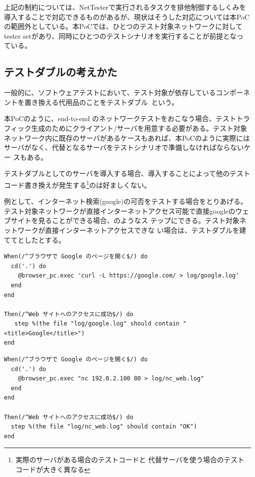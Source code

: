 上記の制約については、NetTesterで実行されるタスクを排他制御するしくみを
導入することで対応できるものがあるが、現状はそうした対応については本PoC
の範囲外としている。本PoCでは、ひとつのテスト対象ネットワークに対して
tester setがあり、同時にひとつのテストシナリオを実行することが前提となっ
ている。

  \subsection{テストダブルの考えかた}
一般的に、ソフトウェアテストにおいて、テスト対象が依存しているコンポーネ
ントを置き換える代用品のことをテストダブル~\cite{test-double}という。

本PoCのように、end-to-end のネットワークテストをおこなう場合、テストトラ
フィック生成のためにクライアント/サーバを用意する必要がある。テスト対象
ネットワーク内に既存のサーバがあるケースもあれば、本PoCのように実際には
サーバがなく、代替となるサーバをテストシナリオで準備しなければならないケー
スもある。

テストダブルとしてのサーバを導入する場合、導入することによって他のテスト
コード書き換えが発生する\footnote{実際のサーバがある場合のテストコードと
代替サーバを使う場合のテストコードが大きく異なる}のは好ましくない。

例として、インターネット検索(google)の可否をテストする場合をとりあげる。
テスト対象ネットワークが直接インターネットアクセス可能で直接googleのウェ
ブサイトを見ることができる場合、のようなス
テップにできる。テスト対象ネットワークが直接インターネットアクセスできな
い場合は、テストダブルを建ててとしたとする。

\begin{lstlisting}[caption=実際のサービスを利用する場合,label=lst:real-service-test]
When(/^ブラウザで Google のページを開く$/) do
  cd('.') do
    @browser_pc.exec 'curl -L https://google.com/ > log/google.log'
  end
end

Then(/^Web サイトへのアクセスに成功$/) do
   step %(the file "log/google.log" should contain "<title>Google</title>")
end
\end{lstlisting}

\begin{lstlisting}[caption=テストダブルを利用する場合,label=lst:testdouble-test]
When(/^ブラウザで Google のページを開く$/) do
  cd('.') do
    @browser_pc.exec "nc 192.0.2.100 80 > log/nc_web.log"
  end
end

Then(/^Web サイトへのアクセスに成功$/) do
  step %(the file "log/nc_web.log" should contain "OK")
end
\end{lstlisting}

